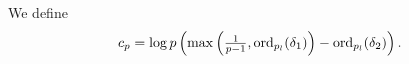 %

We define 
\[c_p=\log p\left(\max\left(\tfrac{1}{p-1},\operatorname{ord}_{p_l}(\delta_1)\right)-\operatorname{ord}_{p_l}(\delta_2)\right).\]

